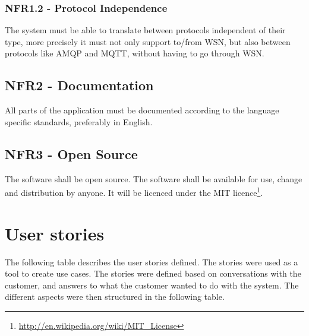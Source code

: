 \subsubsection{NFR1.2 - Protocol Independence}
\label{subsec:requirements_engineering-non_functional_requirements-protocol_independence}

The system must be able to translate between protocols independent of their type, more precisely it must not only support to/from WSN, but also between protocols like AMQP and MQTT, without having to go through WSN.

\subsection{NFR2 - Documentation}
\label{subsec:requirements_engineering-non_functional_requirements-documentation}

All parts of the application must be documented according to the language specific standards, preferably in English.

\subsection{NFR3 - Open Source}
\label{subsec:requirements_engineering-non_functional_requirements-open_source}

The software shall be open source. The software shall be available for use, change and distribution by anyone. It will be licenced under the MIT licence\footnote{\url{http://en.wikipedia.org/wiki/MIT_License}}.

\section{User stories}
\label{sec:requirements_engineering-user_stories}

The following table describes the user stories defined. The stories were used as a tool to create use cases. The stories were defined based on conversations with the customer, and answers to what the customer wanted to do with the system. The different aspects were then structured in the following table. 

\clearpage

